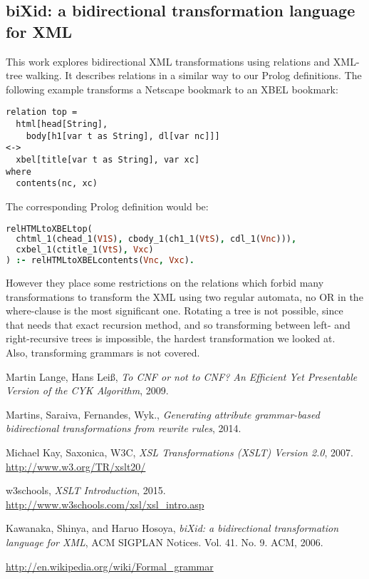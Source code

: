 \documentclass[a4paper]{article}
\begin{document}
\subsection*{biXid: a bidirectional transformation language for XML\cite{xmlbt}}
This work explores bidirectional XML transformations using relations and XML-tree walking. It describes relations in a similar way to our Prolog definitions. The following example transforms a Netscape bookmark to an XBEL bookmark:
\begin{verbatim}
relation top =                                 
  html[head[String],                           
    body[h1[var t as String], dl[var nc]]]     
<->                                            
  xbel[title[var t as String], var xc]         
where                                          
  contents(nc, xc)                             
\end{verbatim}
The corresponding Prolog definition would be:
\begin{lstlisting}[language=Prolog]
relHTMLtoXBELtop(
  chtml_1(chead_1(V1S), cbody_1(ch1_1(VtS), cdl_1(Vnc))), 
  cxbel_1(ctitle_1(VtS), Vxc)
) :- relHTMLtoXBELcontents(Vnc, Vxc).
\end{lstlisting}
However they place some restrictions on the relations which forbid many transformations to transform the XML using two regular automata, no OR in the where-clause is the most significant one. Rotating a tree is not possible, since that needs that exact recursion method, and so transforming between left- and right-recursive trees is impossible, the hardest transformation we looked at.\\
Also, transforming grammars is not covered.

\begin{thebibliography}{9}
  Martin Lange, Hans Leiß, \emph{To CNF or not to CNF? An Efficient Yet Presentable Version of the CYK Algorithm}, 2009.

  Martins, Saraiva, Fernandes, Wyk., \emph{Generating attribute grammar-based bidirectional transformations from rewrite rules}, 2014.

  Michael Kay, Saxonica, W3C, \emph{XSL Transformations (XSLT) Version 2.0}, 2007. \url{http://www.w3.org/TR/xslt20/}

  w3schools, \emph{XSLT Introduction}, 2015. \url{http://www.w3schools.com/xsl/xsl_intro.asp}

  Kawanaka, Shinya, and Haruo Hosoya, \emph{biXid: a bidirectional transformation language for XML}, ACM SIGPLAN Notices. Vol. 41. No. 9. ACM, 2006.

\end{thebibliography}
\url{http://en.wikipedia.org/wiki/Formal_grammar}
\end{document}
